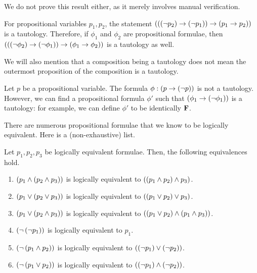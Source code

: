 We do not prove this result either, as it merely involves manual verification.

\begin{boxexample}
    For propositional variables $p_1, p_2$, the statement $\left( \left( \left( \neg p_2 \right) \to \left( \neg p_1 \right) \right) \to \left( p_1 \to p_2 \right) \right)$ is a tautology. Therefore, if $\phi_1$ and $\phi_2$ are propositional formulae, then $\left( \left( \left( \neg \phi_2 \right) \to \left( \neg \phi_1 \right) \right) \to \left( \phi_1 \to \phi_2 \right) \right)$ is a tautology as well.
\end{boxexample}

We will also mention that a composition being a tautology does not mean the outermost proposition of the composition is a tautology.

\begin{boxnexample}
    Let $p$ be a propositional variable. The formula $\phi : \left( p \to \left( \neg p \right) \right)$ is not a tautology. However, we can find a propositional formula $\phi'$ such that $\left( \phi_1 \to \left( \neg \phi_1 \right) \right)$ is a tautology: for example, we can define $\phi'$ to be identically $\mathbf{F}$.
\end{boxnexample}

There are numerous propositional formulae that we know to be logically equivalent. Here is a (non-exhaustive) list.

\begin{boxexample}
    Let $p_1, p_2, p_3$ be logically equivalent formulae. Then, the following equivalences hold.
    \begin{enumerate}[noitemsep]
        \item $\left( p_1 \land \left( p_2 \land p_3 \right) \right)$ is logically equivalent to $\left( \left( p_1 \land p_2 \right) \land p_3 \right)$.
        
        \item $\left( p_1 \lor \left( p_2 \lor p_3 \right) \right)$ is logically equivalent to $\left( \left( p_1 \lor p_2 \right) \lor p_3 \right)$.

        \item $\left( p_1 \lor \left( p_2 \land p_3 \right) \right)$ is logically equivalent to $\left( \left( p_1 \lor p_2 \right) \land \left( p_1 \land p_3 \right) \right)$.

        \item $\left( \neg \left( \neg p_1 \right) \right)$ is logically equivalent to $p_1$.

        \item $\left( \neg \left( p_1 \land p_2 \right) \right)$ is logically equivalent to $\left( \left( \neg p_1 \right) \lor \left( \neg p_2 \right) \right)$.

        \item $\left( \neg \left( p_1 \lor p_2 \right) \right)$ is logically equivalent to $\left( \left( \neg p_1 \right) \land \left( \neg p_2 \right) \right)$.
    \end{enumerate}
\end{boxexample}

